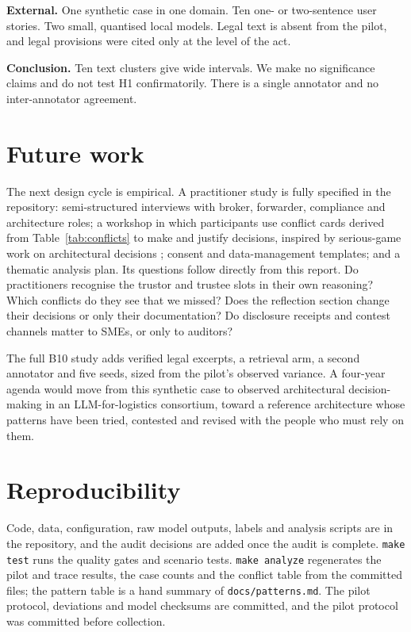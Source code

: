 \documentclass[10pt,twocolumn]{article}
\begin{document}
\textbf{External.} One synthetic case in one domain. Ten one- or two-sentence user stories. Two small, quantised local models. Legal text is absent from the pilot, and legal provisions were cited only at the level of the act.

\textbf{Conclusion.} Ten text clusters give wide intervals. We make no significance claims and do not test H1 confirmatorily. There is a single annotator and no inter-annotator agreement.

\section{Future work}\label{sec:future}
The next design cycle is empirical. A practitioner study is fully specified in the repository: semi-structured interviews with broker, forwarder, compliance and architecture roles; a workshop in which participants use conflict cards derived from Table~\ref{tab:conflicts} to make and justify decisions, inspired by serious-game work on architectural decisions \cite{alidoosti2023}; consent and data-management templates; and a thematic analysis plan. Its questions follow directly from this report. Do practitioners recognise the trustor and trustee slots in their own reasoning? Which conflicts do they see that we missed? Does the reflection section change their decisions or only their documentation? Do disclosure receipts and contest channels matter to SMEs, or only to auditors?

The full B10 study adds verified legal excerpts, a retrieval arm, a second annotator and five seeds, sized from the pilot's observed variance. A four-year agenda would move from this synthetic case to observed architectural decision-making in an LLM-for-logistics consortium, toward a reference architecture whose patterns have been tried, contested and revised with the people who must rely on them.

\section*{Reproducibility}
Code, data, configuration, raw model outputs, labels and analysis scripts are in the repository, and the audit decisions are added once the audit is complete. \texttt{make test} runs the quality gates and scenario tests. \texttt{make analyze} regenerates the pilot and trace results, the case counts and the conflict table from the committed files; the pattern table is a hand summary of \texttt{docs/patterns.md}. The pilot protocol, deviations and model checksums are committed, and the pilot protocol was committed before collection.
\end{document}
